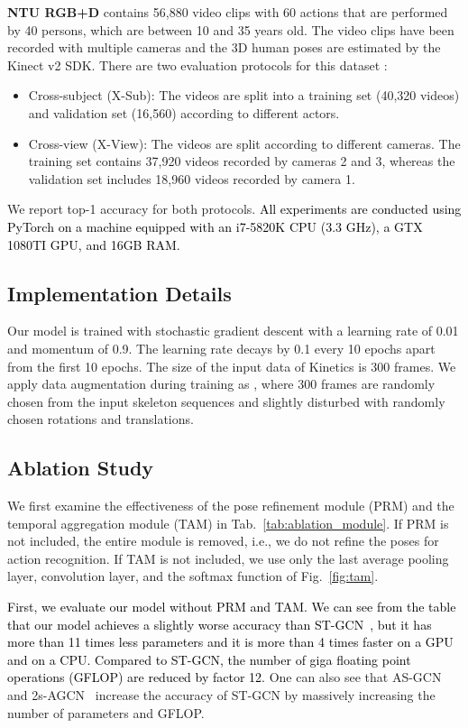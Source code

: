\documentclass[letterpaper, 10 pt, conference]{ieeeconf}
\newcommand{\todo}[1]{{\textcolor{black}{#1}}}
\begin{document}
\textbf{NTU RGB+D} \cite{shahroudy2016ntu} contains 56,880 video clips with 60 actions that are performed by 40 persons, which are between 10 and 35 years old. The video clips have been recorded with multiple cameras and the 3D human poses are estimated by the Kinect v2 SDK. 
There are two evaluation protocols for this dataset \cite{shahroudy2016ntu}: 
\begin{itemize}
    \item Cross-subject (X-Sub): The videos are split into a training set (40,320 videos) and validation set (16,560) according to different actors.
    \item Cross-view (X-View): The videos are split according to different cameras. The training set contains 37,920 videos recorded by cameras 2 and 3, whereas the validation set includes 18,960 videos recorded by camera 1. 
\end{itemize}
We report top-1 accuracy for both protocols.
\todo{
All experiments are conducted using PyTorch on a machine equipped with an i7-5820K CPU (3.3 GHz), a GTX 1080TI GPU, and 16GB RAM.
}

\subsection{Implementation Details} 
Our model is trained with stochastic gradient descent with a learning rate of 0.01 and momentum of 0.9. 
The learning rate decays by 0.1 every 10 epochs apart from the first 10 epochs. 
The size of the input data of Kinetics is 300 frames. We apply data augmentation during training as \cite{yan2018spatial}, where 300 frames are randomly chosen from the input skeleton sequences and slightly disturbed with randomly chosen rotations and translations.


\subsection{Ablation Study}
We first examine the effectiveness of the pose refinement module (PRM) and the temporal aggregation module (TAM) in Tab.~\ref{tab:ablation_module}. If PRM is not included, the entire module is removed, i.e., we do not refine the poses for action recognition. If TAM is not included, we use only the last average pooling layer, 
convolution layer, and the softmax function of Fig.~\ref{fig:tam}. 

\todo
{
First, we evaluate our model without PRM and TAM. We can see from the table that our model achieves a slightly worse accuracy than ST-GCN~\cite{yan2018spatial}, but it has more than 11 times less parameters and it is more than 4 times faster on a GPU and on a CPU. Compared to ST-GCN, the number of giga floating point operations (GFLOP) are reduced by factor 12. 
}
One can also see that AS-GCN~\cite{li2019actional} and 2s-AGCN~\cite{shi2019two} increase the accuracy of ST-GCN by massively increasing the number of parameters and GFLOP.            
\end{document}
